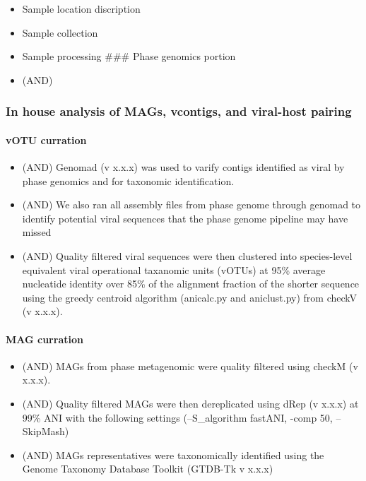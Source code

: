 \documentclass[
]{article}
\providecommand{\tightlist}{%
  \setlength{\itemsep}{0pt}\setlength{\parskip}{0pt}}
\begin{document}
\begin{itemize}
\tightlist
\item
  Sample location discription
\item
  Sample collection
\item
  Sample processing \#\#\# Phase genomics portion
\item
  (AND)
\end{itemize}

\subsubsection{In house analysis of MAGs, vcontigs, and viral-host
pairing}\label{in-house-analysis-of-mags-vcontigs-and-viral-host-pairing}

\paragraph{vOTU curration}\label{votu-curration}

\begin{itemize}
\tightlist
\item
  (AND) Genomad (v x.x.x) was used to varify contigs identified as viral
  by phase genomics and for taxonomic identification.
\item
  (AND) We also ran all assembly files from phase genome through genomad
  to identify potential viral sequences that the phase genome pipeline
  may have missed
\item
  (AND) Quality filtered viral sequences were then clustered into
  species-level equivalent viral operational taxanomic units (vOTUs) at
  95\% average nucleatide identity over 85\% of the alignment fraction
  of the shorter sequence using the greedy centroid algorithm
  (anicalc.py and aniclust.py) from checkV (v x.x.x).
\end{itemize}

\paragraph{MAG curration}\label{mag-curration}

\begin{itemize}
\tightlist
\item
  (AND) MAGs from phase metagenomic were quality filtered using checkM
  (v x.x.x).
\item
  (AND) Quality filtered MAGs were then dereplicated using dRep (v
  x.x.x) at 99\% ANI with the following settings (--S\_algorithm
  fastANI, -comp 50, --SkipMash)
\item
  (AND) MAGs representatives were taxonomically identified using the
  Genome Taxonomy Database Toolkit (GTDB-Tk v x.x.x)
\end{itemize}
\end{document}
